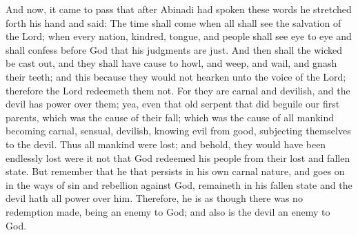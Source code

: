 \bchapter
\bverse \iffalse And now, it came to pass that after Abinadi had spoken these words he stretched forth his hand and said: The time shall come when all shall see the salvation of the Lord; when every nation, kindred, tongue, and people shall see eye to eye and shall confess before God that his judgments are just. \fi
And now, it came to pass that after Abinadi had spoken these words he stretched forth his hand and said: The time shall come when all shall see the salvation of the Lord; when every nation, kindred, tongue, and people shall see eye to eye and shall confess before God that his judgments are just.
\bverse \iffalse And then shall the wicked be cast out, and they shall have cause to howl, and weep, and wail, and gnash their teeth; and this because they would not hearken unto the voice of the Lord; therefore the Lord redeemeth them not. \fi
And then shall the wicked be cast out, and they shall have cause to howl, and weep, and wail, and gnash their teeth; and this because they would not hearken unto the voice of the Lord; therefore the Lord redeemeth them not.
\bverse \iffalse For they are carnal and devilish, and the devil has power over them; yea, even that old serpent that did beguile our first parents, which was the cause of their fall; which was the cause of all mankind becoming carnal, sensual, devilish, knowing evil from good, subjecting themselves to the devil. \fi
For they are carnal and devilish, and the devil has power over them; yea, even that old serpent that did beguile our first parents, which was the cause of their fall; which was the cause of all mankind becoming carnal, sensual, devilish, knowing evil from good, subjecting themselves to the devil.
\bverse \iffalse Thus all mankind were lost; and behold, they would have been endlessly lost were it not that God redeemed his people from their lost and fallen state. \fi
Thus all mankind were lost; and behold, they would have been endlessly lost were it not that God redeemed his people from their lost and fallen state.
\bverse \iffalse But remember that he that persists in his own carnal nature, and goes on in the ways of sin and rebellion against God, remaineth in his fallen state and the devil hath all power over him. Therefore, he is as though there was no redemption made, being an enemy to God; and also is the devil an enemy to God. \fi
But remember that he that persists in his own carnal nature, and goes on in the ways of sin and rebellion against God, remaineth in his fallen state and the devil hath all power over him. Therefore, he is as though there was no redemption made, being an enemy to God; and also is the devil an enemy to God.

